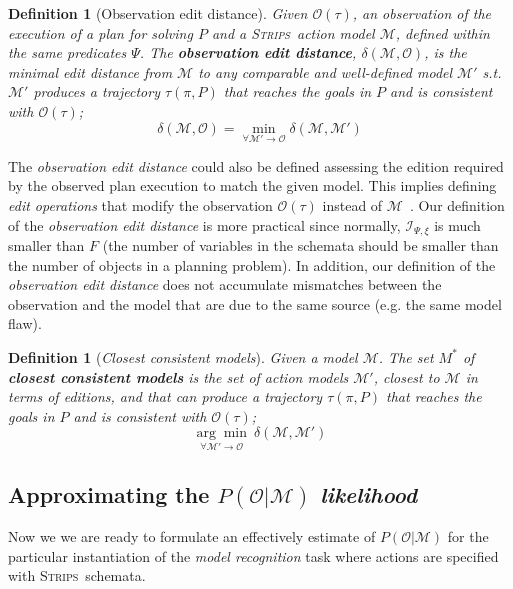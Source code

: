 \documentclass[letterpaper]{article} %
\newcommand{\strips}{\textsc{Strips}}     %
\newtheorem{definition}[theorem]{Definition}
\begin{document}
\begin{definition}[Observation edit distance]
  Given $\mathcal{O}(\tau)$, an observation of the execution of a plan for solving $P$ and a \strips\ action model $\mathcal{M}$, defined within the same predicates $\Psi$. The {\bf observation edit distance}, $\delta(\mathcal{M},\mathcal{O})$, is the minimal edit distance from $\mathcal{M}$ to any {\em comparable} and well-defined model $\mathcal{M}'$ s.t. $\mathcal{M}'$ produces a trajectory $\tau(\pi,P)$ that reaches the goals in $P$ and is {\em consistent} with $\mathcal{O}(\tau)$; \[\delta(\mathcal{M},\mathcal{O})=\min_{\forall \mathcal{M}' \rightarrow \mathcal{O}} \delta(\mathcal{M},\mathcal{M}')\]
\end{definition}

The {\em observation edit distance} could also be defined assessing the edition required by the observed plan execution to match the given model. This implies defining {\em edit operations} that modify the observation $\mathcal{O}(\tau)$ instead of $\mathcal{M}$~\cite{yang2007learning,sohrabi:precognition:IJCAI2016}. Our definition of the {\em observation edit distance} is more practical since normally, ${\mathcal I}_{\Psi,\xi}$ is much smaller than $F$ (the number of variables in the schemata should be smaller than the number of objects in a planning problem). In addition, our definition of the {\em observation edit distance} does not accumulate mismatches between the observation and the model that are due to the same source (e.g. the same model flaw).

\begin{definition}[{\em Closest consistent models}] \label{consistent}
Given a model $\mathcal{M}$. The set $M^*$ of {\bf closest consistent models} is the set of action models $\mathcal{M}'$, closest to $\mathcal{M}$ in terms of editions, and that can produce a trajectory $\tau(\pi,P)$ that reaches the goals in $P$ and is {\em consistent} with $\mathcal{O}(\tau)$;
  \[\underset{\forall \mathcal{M}' \rightarrow \mathcal{O}}{\arg\min}\ \delta(\mathcal{M},\mathcal{M}') \]
\end{definition}

\subsection{Approximating the $P(\mathcal{O}|\mathcal{M})$ {\em likelihood}}
Now we we are ready to formulate an effectively estimate of $P(\mathcal{O}|\mathcal{M})$ for the particular instantiation of the {\em model recognition} task where actions are specified with \strips\ schemata.
\end{document}
